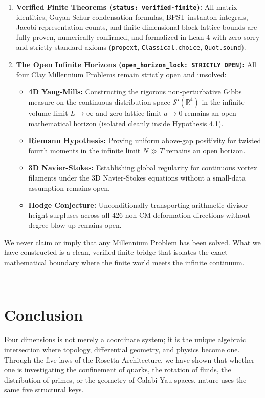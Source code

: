 \documentclass[11pt,a4paper]{article}
\begin{document}
\begin{enumerate}
    \item \textbf{Verified Finite Theorems (\texttt{status: verified-finite}):}
    All matrix identities, Guyan Schur condensation formulas, BPST instanton integrals, Jacobi representation counts, and finite-dimensional block-lattice bounds are fully proven, numerically confirmed, and formalized in Lean 4 with zero sorry and strictly standard axioms (\texttt{propext}, \texttt{Classical.choice}, \texttt{Quot.sound}).
    \item \textbf{The Open Infinite Horizons (\texttt{open\_horizon\_lock: STRICTLY OPEN}):}
    All four Clay Millennium Problems remain strictly open and unsolved:
    \begin{itemize}
        \item \textbf{4D Yang-Mills:} Constructing the rigorous non-perturbative Gibbs measure on the continuous distribution space $\mathcal{S}'(\mathbb{R}^4)$ in the infinite-volume limit $L \to \infty$ and zero-lattice limit $a \to 0$ remains an open mathematical horizon (isolated cleanly inside Hypothesis 4.1).
        \item \textbf{Riemann Hypothesis:} Proving uniform above-gap positivity for twisted fourth moments in the infinite limit $N \gg T$ remains an open horizon.
        \item \textbf{3D Navier-Stokes:} Establishing global regularity for continuous vortex filaments under the 3D Navier-Stokes equations without a small-data assumption remains open.
        \item \textbf{Hodge Conjecture:} Unconditionally transporting arithmetic divisor height surpluses across all 426 non-CM deformation directions without degree blow-up remains open.
    \end{itemize}
\end{enumerate}

We never claim or imply that any Millennium Problem has been solved. What we have constructed is a clean, verified finite bridge that isolates the exact mathematical boundary where the finite world meets the infinite continuum.

---

\section{Conclusion}

Four dimensions is not merely a coordinate system; it is the unique algebraic intersection where topology, differential geometry, and physics become one. Through the five laws of the Rosetta Architecture, we have shown that whether one is investigating the confinement of quarks, the rotation of fluids, the distribution of primes, or the geometry of Calabi-Yau spaces, nature uses the same five structural keys.
\end{document}

